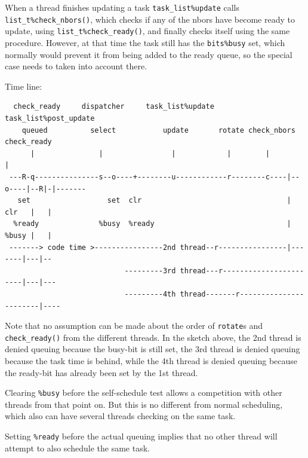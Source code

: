\documentclass[paper=a4,fontsize=11pt]{scrartcl}
\numberwithin{equation}{section}		%
\numberwithin{figure}{section}			%
\numberwithin{table}{section}				%
\newcommand{\codecolor}{\color{Blue}}
\newcommand{\Code}[1]{{\codecolor\texttt{#1}}}
\def\checkready{\Code{check\_ready()}}
\begin{document}
When a thread finishes updating a task \Code{task\_list\%update} calls \Code{list\_t\%check\_nbors()}, which checks if any of the nbors have become ready to update, using \Code{list\_t\%check\_ready()}, and finally checks itself using the same procedure.  However, at that time the task still has the  \Code{bits\%busy} set, which normally would prevent it from being added to the ready queue, so the special case needs to taken into account there.

Time line:
{\codecolor\small\begin{verbatim}
  check_ready     dispatcher     task_list%update      task_list%post_update
    queued          select           update       rotate check_nbors    check_ready
      |               |                |            |        |               |
 ---R-q---------------s--o----+--------u------------r--------c----|--o----|--R|-|-------
   set                  set  clr                                  | clr   |   | 
  %ready              %busy  %ready                               | %busy |   |
 -------> code time >----------------2nd thread--r----------------|-------|---|--
                            ---------3rd thread---r-----------------------|---|---
                            ---------4th thread-------r-----------------------|----
\end{verbatim}}
Note that no assumption can be made about the order of \Code{rotate}s and \checkready{} from the different threads.  In the sketch above, the 2nd thread is denied queuing because the busy-bit is still set, the 3rd thread is denied queuing because the task time is behind, while the 4th thread is denied queuing because the ready-bit has already been set by the 1st thread.

Clearing \Code{\%busy} before the self-schedule test allows a competition with other threads from that point on.  But this is no different from normal scheduling, which also can have several threads checking on the same task.

Setting \Code{\%ready} before the actual queuing implies that no other thread will attempt to also schedule the same task.

\end{document}
